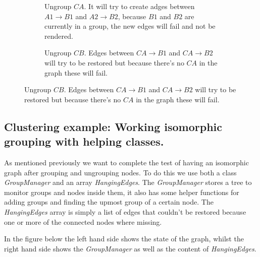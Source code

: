 \begin{figure}[H]
\begin{subfigure}[t]{0.5\textwidth}
    \caption{Ungroup $CA$. It will try to create adges between $A1\rightarrow B1$ and $A2\rightarrow B2$, because $B1$ and $B2$ are currently in a group, the new edges will fail and not be rendered.}
  \end{subfigure}
  \begin{subfigure}[t]{0.5\textwidth}
    \centering
    \caption{Ungroup $CB$. Edges between $CA\rightarrow B1$ and $CA\rightarrow B2$ will try to be restored but because there's no $CA$ in the graph these will fail.}
  \end{subfigure}
\end{figure}

\subsection{Clustering example: Working isomorphic grouping with helping classes.}
As mentioned previously we want to complete the test of having an isomorphic graph after grouping and ungrouping nodes. To do this we use both a class \textit{GroupManager} and an array \textit{HangingEdges}. The \textit{GroupManager} stores a tree to monitor groups and nodes inside them, it also has some helper functions for adding groups and finding the upmost group of a certain node. The \textit{HangingEdges} array is simply a list of edges that couldn't be restored because one or more of the connected nodes where missing.

In the figure below the left hand side shows the state of the graph, whilst the right hand side shows the \textit{GroupManager} as well as the content of \textit{HangingEdges}.

